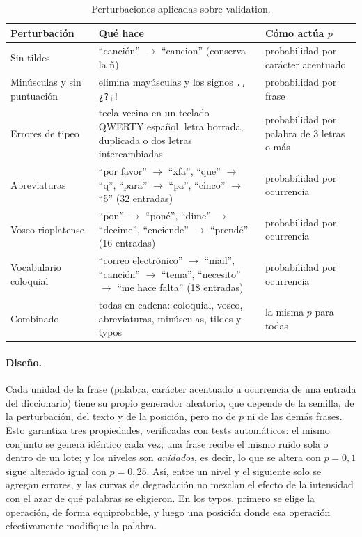 \documentclass[11pt,a4paper]{article}
\newcommand{\cod}[1]{\texttt{#1}}
\begin{document}
\begin{table}[H]
\centering
\small
\begin{tabular}{@{}l p{6.6cm} p{4.2cm}@{}}
\toprule
Perturbación & Qué hace & Cómo actúa $p$ \\
\midrule
Sin tildes & \enquote{canción} $\to$ \enquote{cancion} (conserva la ñ) &
  probabilidad por carácter acentuado \\
Minúsculas y sin puntuación & elimina mayúsculas y los signos \cod{.,¿?¡!} &
  probabilidad por frase \\
Errores de tipeo & tecla vecina en un teclado QWERTY español, letra borrada, duplicada o dos
  letras intercambiadas & probabilidad por palabra de 3 letras o más \\
Abreviaturas & \enquote{por favor} $\to$ \enquote{xfa}, \enquote{que} $\to$ \enquote{q},
  \enquote{para} $\to$ \enquote{pa}, \enquote{cinco} $\to$ \enquote{5} (32 entradas) &
  probabilidad por ocurrencia \\
Voseo rioplatense & \enquote{pon} $\to$ \enquote{poné}, \enquote{dime} $\to$
  \enquote{decime}, \enquote{enciende} $\to$ \enquote{prendé} (16 entradas) &
  probabilidad por ocurrencia \\
Vocabulario coloquial & \enquote{correo electrónico} $\to$ \enquote{mail}, \enquote{canción}
  $\to$ \enquote{tema}, \enquote{necesito} $\to$ \enquote{me hace falta} (18 entradas) &
  probabilidad por ocurrencia \\
Combinado & todas en cadena: coloquial, voseo, abreviaturas, minúsculas, tildes y typos &
  la misma $p$ para todas \\
\bottomrule
\end{tabular}
\caption{Perturbaciones aplicadas sobre validation.}
\label{tab:perturbaciones}
\end{table}

\paragraph{Diseño.} Cada unidad de la frase (palabra, carácter acentuado u ocurrencia de una
entrada del diccionario) tiene su propio generador aleatorio, que depende de la semilla, de la
perturbación, del texto y de la posición, pero no de $p$ ni de las demás frases. Esto garantiza
tres propiedades, verificadas con tests automáticos: el mismo conjunto se genera idéntico cada
vez; una frase recibe el mismo ruido sola o dentro de un lote; y los niveles son
\emph{anidados}, es decir, lo que se altera con $p=0{,}1$ sigue alterado igual con $p=0{,}25$.
Así, entre un nivel y el siguiente solo se agregan errores, y las curvas de degradación no
mezclan el efecto de la intensidad con el azar de qué palabras se eligieron. En los typos,
primero se elige la operación, de forma equiprobable, y luego una posición donde esa operación
efectivamente modifique la palabra.
\end{document}
